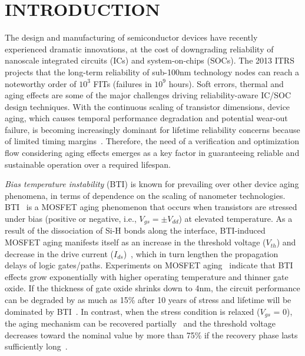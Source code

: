 \section{INTRODUCTION}
The design and manufacturing of semiconductor devices have recently experienced dramatic innovations, at the cost of downgrading reliability of nanoscale integrated circuits (ICs) and system-on-chips (SOCs). The 2013 ITRS~\cite{itrs2013} projects that the long-term reliability of sub-100nm technology nodes can reach a noteworthy order of $10^3$ FITs (failures in $10^9$ hours). Soft errors, thermal and aging effects are some of the major challenges driving reliability-aware IC/SOC design techniques. With the continuous scaling of transistor dimensions, device aging, which causes temporal performance degradation and potential wear-out failure, is becoming increasingly dominant for lifetime reliability concerns because of limited timing margins~\cite{mcpherson2006reliability}. Therefore, the need of a verification and optimization flow considering aging effects emerges as a key factor in guaranteeing reliable and sustainable operation over a required lifespan.

\textit{Bias temperature instability} (BTI) is known for prevailing over other device aging phenomena, in terms of dependence on the scaling of nanometer technologies. BTI~\cite{schroder2003negative} is a MOSFET aging phenomenon that occurs when transistors are stressed under bias (positive or negative, i.e., $V_{gs} = \pm V_{dd}$) at elevated temperature. As a result of the dissociation of Si-H bonds along the  interface, BTI-induced MOSFET aging manifests itself as an increase in the threshold voltage ($V_{th}$) and decrease in the drive current ($I_{ds}$)~\cite{stathis2006negative}, which in turn lengthen the propagation delays of logic gates/paths. Experiments on MOSFET aging~\cite{chakravarthi2004comprehensive} indicate that BTI effects grow exponentially with higher operating temperature and thinner gate oxide. If the thickness of gate oxide shrinks down to 4nm, the circuit performance can be degraded by as much as 15\% after 10 years of stress and lifetime will be dominated by BTI~\cite{kimizuka1999impact}. In contrast, when the stress condition is relaxed ($V_{gs}$ = 0), the aging mechanism can be recovered partially~\cite{kumar2006analytical} and the threshold voltage decreases toward the nominal value by more than 75\% if the recovery phase lasts sufficiently long~\cite{wang2010impact}.

